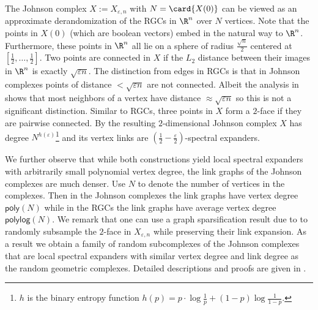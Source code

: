 The Johnson complex $X:=X_{\varepsilon,n}$ with $N = \card{X(0)}$ can be viewed as an approximate derandomization of the RGCs in $\R^{n}$ over $N$ vertices. Note that the points in \(X(0)\) (which are boolean vectors) embed in the natural way to \(\R^{n}\). Furthermore, these points in $\R^{n}$ all lie on a sphere of radius $\frac{\sqrt{n}}{2}$ centered at $[\frac{1}{2}, \dots,\frac{1}{2}]$. Two points are connected in $X$ if the $L_2$ distance between their images in $\R^{n}$ is exactly $\sqrt{\varepsilon n}$. The distinction from edges in RGCs is that in Johnson complexes points of distance $<\sqrt{\varepsilon n}$ are not connected. Albeit the analysis in \cite{LiuMSY2023} shows that most neighbors of a vertex have distance \(\approx \sqrt{\varepsilon n}\) so this is not a significant distinction. Similar to RGCs, three points in $X$ form a $2$-face if they are pairwise connected. By  the resulting $2$-dimensional Johnson complex $X$ has degree $N^{h(\varepsilon)}$\footnote{$h$ is the binary entropy function $h(p) = p\cdot\log\frac{1}{p} + (1-p)\log\frac{1}{1-p}$. } and its vertex links are $\left(\frac{1}{2} - \frac{\varepsilon}{2}\right)$-spectral expanders. 

%
\begin{remark}
    We further observe that while both constructions yield local spectral expanders with arbitrarily small polynomial vertex degree, the link graphs of the Johnson complexes are much denser. Use $N$ to denote the number of vertices in the complexes. Then in the Johnson complexes the link graphs have vertex degree $\mathsf{poly}(N)$ while in the RGCs the link graphs have average vertex degree $\mathsf{polylog}(N)$.
    We remark that one can use a graph sparsification result due to \cite{ChungH07} to randomly subsample the $2$-face in $X_{\varepsilon,n}$ while preserving their link expansion. As a result we obtain a family of random subcomplexes of the Johnson complexes that are local spectral expanders with similar vertex degree and link degree as the random geometric complexes. Detailed descriptions and proofs are given in .
\end{remark}



